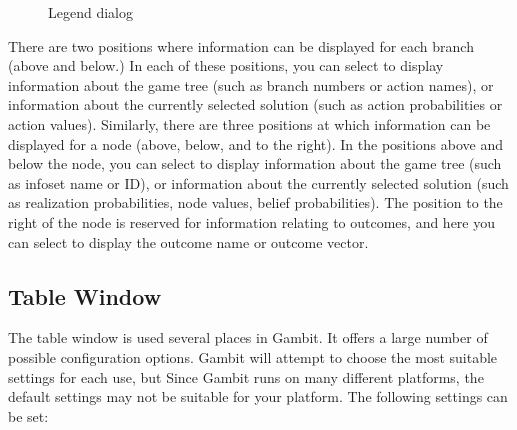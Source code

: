 \documentclass[12pt]{report}
\begin{document}
\begin{figure}
\caption{Legend dialog}\label{fig_legend}
\end{figure}

There are two positions where information can be displayed for each
branch (above and below.)  In each of these positions, you can select
to display information about the game tree (such as branch numbers or
action names), or information about the currently selected solution
(such as action probabilities or action values).  Similarly, there are
three positions at which information can be displayed for a node
(above, below, and to the right).  In the positions above and below
the node, you can select to display information about the game tree
(such as infoset name or ID), or information about the currently
selected solution (such as realization probabilities, node values,
belief probabilities). The position to the right of the node is
reserved for information relating to outcomes, and here you can select
to display the outcome name or outcome vector.

\subsection{Table Window}\label{TableWindow}
The table window is used several places in Gambit.  It offers a large
number of possible configuration options.  Gambit will attempt to
choose the most suitable settings for each use, but Since Gambit runs
on many different platforms, the default settings may not be suitable
for your platform.  The following settings can be set:
\end{document}
